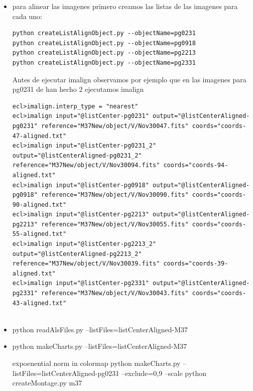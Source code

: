 \documentclass{article}
\begin{document}
\begin{itemize}
{\begin{verbatim}
\end{verbatim}
}

\item 

para alinear las imagenes primero creamos las listas de las imagenes para cada uno:

\begin{verbatim}
python createListAlignObject.py --objectName=pg0231
python createListAlignObject.py --objectName=pg0918
python createListAlignObject.py --objectName=pg2213
python createListAlignObject.py --objectName=pg2331

\end{verbatim}
Antes de ejecutar imalign observamos por ejemplo que en las imagenes para pg0231 de han hecho 2
ejecutamos imalign


{\tiny 
\begin{verbatim}
ecl>imalign.interp_type = "nearest" 
ecl>imalign input="@listCenter-pg0231" output="@listCenterAligned-pg0231" reference="M37New/object/V/Nov30047.fits" coords="coords-47-aligned.txt"
ecl>imalign input="@listCenter-pg0231_2" output="@listCenterAligned-pg0231_2" reference="M37New/object/V/Nov30094.fits" coords="coords-94-aligned.txt"
ecl>imalign input="@listCenter-pg0918" output="@listCenterAligned-pg0918" reference="M37New/object/V/Nov30090.fits" coords="coords-90-aligned.txt"
ecl>imalign input="@listCenter-pg2213" output="@listCenterAligned-pg2213" reference="M37New/object/V/Nov30055.fits" coords="coords-55-aligned.txt"
ecl>imalign input="@listCenter-pg2213_2" output="@listCenterAligned-pg2213_2" reference="M37New/object/V/Nov30039.fits" coords="coords-39-aligned.txt"
ecl>imalign input="@listCenter-pg2331" output="@listCenterAligned-pg2331" reference="M37New/object/V/Nov30043.fits" coords="coords-43-aligned.txt"


\end{verbatim}
}

\item python readAlsFiles.py --listFiles=listCenterAligned-M37
\item python makeCharts.py --listFiles=listCenterAligned-M37

expoenential norm in colormap
 python makeCharts.py --listFiles=listCenterAligned-pg0231 --exclude=0,9 --scale
python createMontage.py m37


\end{itemize}
\end{document}
